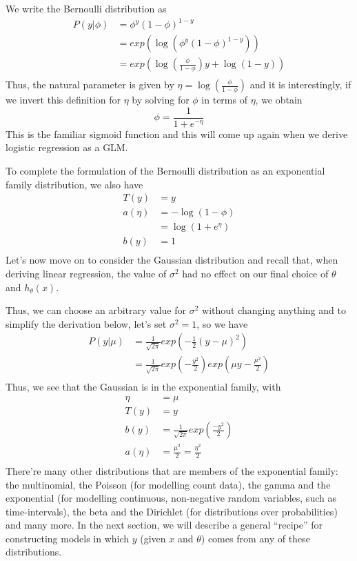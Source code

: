 We write the Bernoulli distribution as
\begin{align*}
    P(y | \phi) & = \phi ^ y (1 - \phi)^{1 - y} \\
                & = exp(\log(\phi^y (1 - \phi)^{1 - y})) \\
                & = exp \left(\log \left(\frac{\phi}{1-\phi}\right)y + \log (1 - y)\right) \\
\end{align*}
Thus, the natural parameter is given by $\eta= \log(\frac{\phi}{1-\phi})$ and it is interestingly,
if we invert this definition for $\eta$ by solving for $\phi$ in terms of $\eta$, we obtain
\[ \phi = \frac{1}{1 + e ^ {-\eta}} \]
This is the familiar sigmoid function and this will come up again when we derive logistic regression as a GLM.

To complete the formulation of the Bernoulli distribution as an exponential family distribution, we also have
\begin{align*}
    T(y) & = y \\
    a(\eta) & = - \log (1 - \phi) \\
            & = \log (1 + e^{\eta}) \\
    b(y) & =  1 \\
\end{align*}
Let’s now move on to consider the Gaussian distribution and recall that, when deriving linear regression, 
the value of $\sigma ^ 2$ had no effect on our final choice of $\theta$ and $h_{\theta}(x)$.

Thus, we can choose an arbitrary value for $\sigma^2$ without changing anything and to simplify the derivation below,
let’s set $\sigma^2 = 1$, so we have
\begin{align*}
    P(y | \mu) & = \frac{1}{\sqrt{2 \pi}} exp \left(-\frac{1}{2} (y - \mu)^2 \right) \\
               & = \frac{1}{\sqrt{2 \pi}} exp \left(-\frac{y^2}{2}\right) exp\left(\mu y - \frac{\mu^2}{2}\right) \\
\end{align*}
Thus, we see that the Gaussian is in the exponential family, with
\begin{align*}
    \eta & = \mu \\
    T(y) & = y \\
    b(y) & = \frac{1}{\sqrt{2 \pi}} exp(\frac{-y^2}{2}) \\
    a(\eta) & = \frac{\mu^2}{2} = \frac{\eta^2}{2} \\
\end{align*}
There’re many other distributions that are members of the exponential family: 
the multinomial, the Poisson (for modelling count data),
the gamma and the exponential (for modelling continuous, non-negative random variables, such as time-intervals),
the beta and the Dirichlet (for distributions over probabilities) and many more.\newline
In the next section, we will describe a general “recipe” for constructing models in which $y$ 
(given $x$ and $\theta$) comes from any of these distributions.

